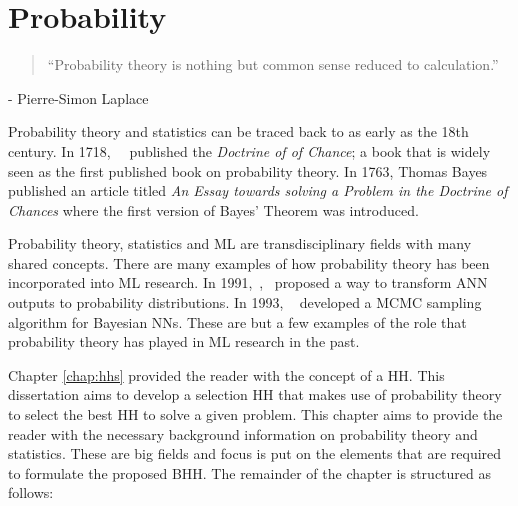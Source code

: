 \chapter{Probability}
\label{chap:probability}

\begin{quotation}
      ``Probability theory is nothing but common sense reduced to calculation.''
\end{quotation}
\begin{flushright}
      - Pierre-Simon Laplace
\end{flushright}

Probability theory and statistics can be traced back to as early as the 18th century. In 1718,~\citeauthor{ref:demoivre:1718}~\cite{ref:demoivre:1718} published the \textit{Doctrine of of Chance}; a book that is widely seen as the first published book on probability theory. In 1763, Thomas Bayes~\cite{ref:bayes:1763} published an article titled \textit{An Essay towards solving a Problem in the Doctrine of Chances} where the first version of Bayes' Theorem was introduced.

Probability theory, statistics and \acf{ML} are transdisciplinary fields with many shared concepts. There are many examples of how probability theory has been incorporated into \acs{ML} research. In 1991,~\citeauthor{ref:denker:1991},~\cite{ref:denker:1991} proposed a way to transform \acf{ANN} outputs to probability distributions. In 1993, \citeauthor{ref:neal:1993}~\cite{ref:neal:1993} developed a \acf{MCMC} sampling algorithm for Bayesian \acp{NN}. These are but a few examples of the role that probability theory has played in \acs{ML} research in the past.

Chapter \ref{chap:hhs} provided the reader with the concept of a \acf{HH}. This dissertation aims to develop a selection \acs{HH} that makes use of probability theory to select the best \acs{HH} to solve a given problem. This chapter aims to provide the reader with the necessary background information on probability theory and statistics. These are big fields and focus is put on the elements that are required to formulate the proposed \acf{BHH}. The remainder of the chapter is structured as follows:


